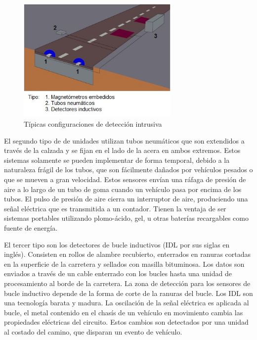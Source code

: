 \begin{figure}[h]
	\centering
	\includegraphics[width=0.7\textwidth]{capitulos/3/figuras/figura1.jpg}
	\caption{\label{fig:intrusiva} Típicas configuraciones de detección intrusiva}	
\end{figure}

El segundo tipo de de unidades utilizan tubos neumáticos que son extendidos a través de la calzada y se fijan en el lado de la acera en ambos extremos. Estos sistemas solamente se pueden implementar de forma temporal, debido a la naturaleza frágil de los tubos, que son fácilmente dañados por vehículos pesados o que se mueven a gran velocidad. Estos sensores envían una ráfaga de presión de aire a lo largo de un tubo de goma cuando un vehículo pasa por encima de los tubos. El pulso de presión de aire cierra un interruptor de aire, produciendo una señal eléctrica que es transmitida a un contador. Tienen la ventaja de ser sistemas portables utilizando plomo-ácido, gel, u otras baterías recargables como fuente de energía.

El tercer tipo son los detectores de bucle inductivos (IDL por sus siglas en inglés). Consisten en rollos de alambre recubierto, enterrados en ranuras cortadas en la superficie de la carretera y sellados con masilla bituminosa. Los datos son enviados a través de un cable enterrado con los bucles hasta una unidad de procesamiento al borde de la carretera. La zona de detección para los sensores de bucle inductivo depende de la forma de corte de la ranuras del bucle. Los IDL son una tecnología barata y madura. La oscilación de la señal eléctrica es aplicada al bucle, el metal contenido en el chasís de un vehículo en movimiento cambia las propiedades eléctricas del circuito. Estos cambios son detectados por una unidad al costado del camino, que disparan un evento de vehículo.

